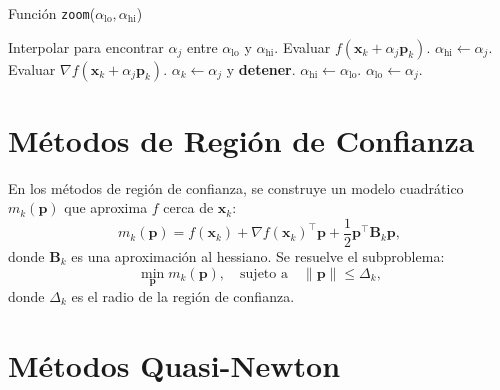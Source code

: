 \begin{algorithm}[H]
\caption{Función \texttt{zoom}($\alpha_{\text{lo}}, \alpha_{\text{hi}}$)}
\label{alg:zoom}
\begin{algorithmic}[1]
\REPEAT
    \STATE Interpolar para encontrar $\alpha_j$ entre $\alpha_{\text{lo}}$ y $\alpha_{\text{hi}}$.
    \STATE Evaluar $f(\mathbf{x}_k + \alpha_j \mathbf{p}_k)$.
        \STATE $\alpha_{\text{hi}} \gets \alpha_j$.
    \ELSE
        \STATE Evaluar $\nabla f(\mathbf{x}_k + \alpha_j \mathbf{p}_k)$.
            \STATE $\alpha_k \gets \alpha_j$ y \textbf{detener}.
        \ENDIF
            \STATE $\alpha_{\text{hi}} \gets \alpha_{\text{lo}}$.
        \ENDIF
        \STATE $\alpha_{\text{lo}} \gets \alpha_j$.
    \ENDIF
{}
\end{algorithmic}
\end{algorithm}

\section{Métodos de Región de Confianza}

En los métodos de región de confianza, se construye un modelo cuadrático $m_k(\mathbf{p})$ que aproxima $f$ cerca de $\mathbf{x}_k$:
\begin{equation}
m_k(\mathbf{p}) = f(\mathbf{x}_k) + \nabla f(\mathbf{x}_k)^\top \mathbf{p} + \frac{1}{2} \mathbf{p}^\top \mathbf{B}_k \mathbf{p},
\end{equation}
donde $\mathbf{B}_k$ es una aproximación al hessiano. Se resuelve el subproblema:
\begin{equation}
\min_{\mathbf{p}} m_k(\mathbf{p}), \quad \text{sujeto a} \quad \|\mathbf{p}\| \leq \Delta_k,
\end{equation}
donde $\Delta_k$ es el radio de la región de confianza.

\section{Métodos Quasi-Newton}

